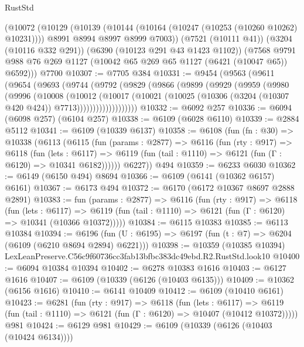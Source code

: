 \begin{lexlean}{RustStd}
\begin{coremodule}
    (@10072
      (@10129
        (@10139
          (@10144 (@10164 (@10247 (@10253 (@10260 @10262) @10231))))
          @8991
          @8994
          @8997
          @8999
          @7003))
      (@7521 (@10111 @41))
      (@3204 (@10116 @332 @291))
      (@6390 (@10123 @291 @43 @1423 @1102))
      (@7568 @9791 @988 @76 @269 @1127 (@10042 @65 @269 @65 @1127 (@6421 (@10047 @65)) @6592)))
    @7700
@10307 := @7705 @384
@10331 := @9454
    (@9563
      (@9611
        (@9654
          (@9693
            (@9744
              (@9792
                (@9829
                  (@9866
                    (@9899
                      (@9929
                        (@9959
                          (@9980
                            (@9996
                              (@10008
                                (@10012
                                  (@10017
                                    (@10021
                                      (@10025
                                        (@10306 (@3204 (@10307 @420 @424)) @7713)))))))))))))))))))
@10332 := @6092 @257
@10336 := @6094 (@6098 @257) (@6104 @257)
@10338 := @6109 (@6028 @6110)
@10339 := @2884 @5112
@10341 := @6109 (@10339 @6137)
@10358 := @6108
    (fun (fn : @30) =>
    @10338
      (@6113
        (@6115
          (fun (params : @2877) =>
          @6116
            (fun (rty : @917) =>
            @6118
              (fun (lets : @6117) =>
              @6119 (fun (tail : @1110) => @6121 (fun (Γ : @6120) => @10341 @6182))))))
        @6227))
    @494
@10359 := @6233 @6030
@10362 := @6149 (@6150 @494) @8694
@10366 := @6109 (@6141 (@10362 @6157) @6161)
@10367 := @6173 @494
@10372 := @6170 (@6172 @10367 @8697 @2888 @2891)
@10383 := fun (params : @2877) =>
  @6116
    (fun (rty : @917) =>
    @6118
      (fun (lets : @6117) =>
      @6119 (fun (tail : @1110) => @6121 (fun (Γ : @6120) => @10341 (@10366 @10372)))))
@10384 := @6115 @10383
@10385 := @6113 @10384
@10394 := @6196 (fun (U : @6195) => @6197 (fun (t : @7) => @6204 (@6109 (@6210 @8694 @2894) @6221)))
@10398 := @10359 (@10385 @10394) LexLeanPreserve.C56c9f60736cc3fab13bfbc383dc49ebd.R2.RustStd.look10
@10400 := @6094 @10384 @10394
@10402 := @6278 @10383 @1616
@10403 := @6127 @1616
@10407 := @6109 (@10339 (@6126 (@10403 @6135)))
@10409 := @10362 (@6156 @1616)
@10410 := @6141 @10409
@10412 := @6109 (@10410 @6161)
@10423 := @6281
    (fun (rty : @917) =>
    @6118
      (fun (lets : @6117) =>
      @6119 (fun (tail : @1110) => @6121 (fun (Γ : @6120) => @10407 (@10412 @10372)))))
    @981
@10424 := @6129 @981
@10429 := @6109 (@10339 (@6126 (@10403 (@10424 @6134))))

\end{coremodule}
\end{lexlean}
